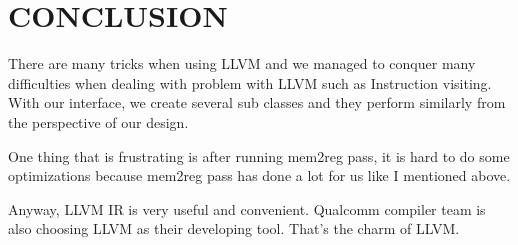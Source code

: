 \section{CONCLUSION}

There are many tricks when using LLVM and we managed to conquer many difficulties when dealing with problem with LLVM such as Instruction visiting. With our interface, we create several sub classes and they perform similarly from the perspective of our design.

One thing that is frustrating is after running mem2reg pass, it is hard to do some optimizations because mem2reg pass has done a lot for us like I mentioned above.

Anyway, LLVM IR is very useful and convenient. Qualcomm compiler team is also choosing LLVM as their developing tool. That's the charm of LLVM.